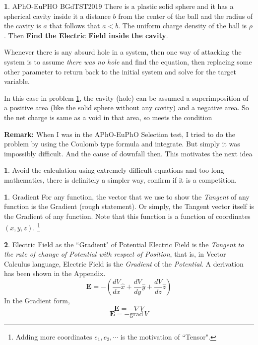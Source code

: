 \documentclass[11pt,a4paper,twocolumn,openright]{article}
\renewcommand{\vec}[1]{\boldsymbol{#1}}
\theoremstyle{definition}
\newtheorem{fct}{ \framebox[0.05\textwidth]{{\sffamily Fact}} }
\theoremstyle{definition}
\newtheorem{pr}{ \framebox[0.05\textwidth]{{\sffamily Pr}} }
\theoremstyle{definition}
\newtheorem{idea}{ \framebox[0.05\textwidth]{{\sffamily Idea}} }
\theoremstyle{definition}
\begin{document}
\begin{pr} \label{pr4}
\textsf{APhO-EuPHO BGdTST2019} There is a plastic solid sphere and it has a spherical cavity inside it a distance $b$ from the center of the ball and the radius of the cavity is $a$ that follows that $a <b$. The uniform charge density of the ball is $\rho$. Then \textbf{Find the Electric Field inside the cavity}.
\end{pr}

{\small Whenever there is any absurd hole in a system, then one way of attacking the system is to assume \emph{there was no hole} and find the equation, then replacing some other parameter to return back to the initial system and solve for the target variable. 

In this case in problem \ref{pr4}, the cavity (hole) can be assumed a superimposition of a positive area (like the solid sphere without any cavity) and a negative area. So the net charge is same as a void in that area, so meets the condition}

{\scriptsize \textbf{Remark:} When I was in the APhO-EuPhO Selection test, I tried to do the problem by using the Coulomb type formula and integrate. But simply it was impossibly difficult. And the cause of downfall then. This motivates the next idea}

\begin{idea}
Avoid the calculation using extremely difficult equations and too long mathematics, there is definitely a simpler way, confirm if it is a competition.
\end{idea}
\begin{fct}{\sffamily Gradient}
For any function, the vector that we use to show the \emph{Tangent} of any function is the Gradient (rough statement). Or simply, the Tangent vector itself is the Gradient of any function. Note that this function is a function of coordinates $(x,y,z)$. \footnote{Adding more coordinates $e_1,e_2,\cdots$ is the motivation of ``Tensor".}
\end{fct}
\begin{fct} {\sffamily Electric Field as the ``Gradient" of Potential}
Electric Field is the \emph{Tangent to the rate of change of Potential with respect of Position}, that is, in Vector Calculus language, Electric Field is the \emph{Gradient} of the \emph{Potential}. A derivation has been shown in the Appendix.
\begin{equation}
 \vec{E} = - \left(	\frac{dV}{dx} \hat{x} + \frac{dV}{dy} \hat{y} + \frac{dV}{dz} \hat{z}\right) 
\end{equation}
In the Gradient form,
\begin{equation}
\vec{E} = - \nabla V
\end{equation}
\begin{equation}
\vec{E} = - \mathrm{grad} \, V 
\end{equation}

\end{fct}
\end{document}

